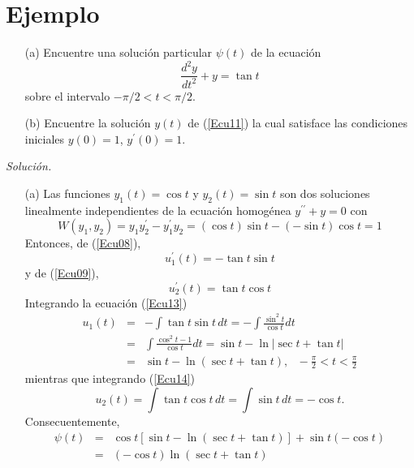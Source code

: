 \documentclass[12pt]{article}
\def\L#1{
#1^{\prime\prime}+#1
}
\begin{document}
\section{Ejemplo}
\begin{itemize}
\item[(a)] Encuentre una solución particular $\psi(t)$ de la ecuación
\begin{equation}
\frac{d^{2}y}{dt^{2}}+y=\tan t
\label{Ecu11}
\end{equation}
sobre el intervalo $-\pi/2<t<\pi/2$.
\item[(b)] Encuentre la solución $y(t)$ de (\ref{Ecu11}) la cual satisface las condiciones iniciales 
$y(0)=1$, $y^{\prime}(0)=1$.
\end{itemize}
{\it Solución.}\\
\begin{itemize}
\item[(a)] Las funciones $y_{1}(t)=\cos t$ y $y_{2}(t)=\sin t$ son dos soluciones linealmente 
independientes de la ecuación homogénea $\L{y}=0$ con
\begin{equation}
W(y_{1},y_{2})=y_{1}y_{2}^{\prime}-y_{1}^{\prime}y_{2}=(\cos t)\sin t-(-\sin t)\cos t=1
\label{Ecu12}
\end{equation}
Entonces, de (\ref{Ecu08}),
\begin{equation}
u_{1}^{\prime}(t)=-\tan t\sin t
\label{Ecu13}
\end{equation}
y de (\ref{Ecu09}),
\begin{equation}
u_{2}^{\prime}(t)=\tan t\cos t
\label{Ecu14}
\end{equation}
Integrando la ecuación (\ref{Ecu13})
\begin{eqnarray}
u_{1}(t)&=&-\int\tan t\sin t\,dt=-\int\frac{\sin^{2}t}{\cos t}dt\nonumber\\
&=&\int\frac{\cos^{2}t-1}{\cos t}dt=\sin t-\ln\left|\sec t+\tan t\right|\nonumber\\
&=&\sin t-\ln(\sec t+\tan t),\,\,\,\,-\frac{\pi}{2}<t<\frac{\pi}{2}
\label{Ecu15}
\end{eqnarray}
mientras que integrando (\ref{Ecu14})
\begin{equation}
u_{2}(t)=\int\tan t\cos t\,dt=\int\sin t\,dt=-\cos t.
\label{Ecu16}
\end{equation}
Consecuentemente,
\begin{eqnarray}
\psi(t)&=&\cos t[\sin t-\ln(\sec t+\tan t)]+\sin t(-\cos t)\nonumber\\
&=&(-\cos t)\ln(\sec t+\tan t)
\label{Ecu17}
\end{eqnarray}

\end{itemize}
\end{document}
